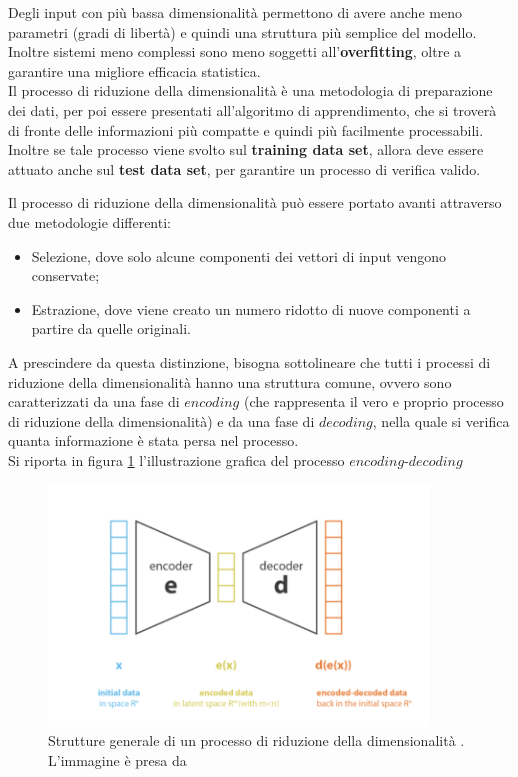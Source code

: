 Degli input con più bassa dimensionalità permettono di avere anche meno parametri (gradi di libertà) e quindi una struttura più semplice del modello. Inoltre sistemi meno complessi sono meno soggetti all'\textbf{overfitting}, oltre a garantire una migliore efficacia statistica. \\
Il processo di riduzione della dimensionalità è una metodologia di preparazione dei dati, per poi essere presentati all'algoritmo di apprendimento, che si troverà di fronte delle informazioni più compatte e quindi più facilmente processabili. Inoltre se tale processo viene svolto sul \textbf{training data set}, allora deve essere attuato anche sul \textbf{test data set}, per garantire un processo di verifica valido.

\newpage

Il processo di riduzione della dimensionalità può essere portato avanti attraverso due metodologie differenti:
\begin{itemize}
	\item Selezione, dove solo alcune componenti dei vettori di input vengono conservate;
	\item Estrazione, dove viene creato un numero ridotto di nuove componenti a partire da quelle originali.
\end{itemize}
A prescindere da questa distinzione, bisogna sottolineare che tutti i processi di riduzione della dimensionalità hanno una struttura comune, ovvero sono caratterizzati da una fase di $\textit{encoding}$ (che rappresenta il vero e proprio processo di riduzione della dimensionalità) e da una fase di $\textit{decoding}$, nella quale si verifica quanta informazione è stata persa nel processo. \\ 
Si riporta in figura \ref{encoder-decoder} l'illustrazione grafica del processo $\textit{encoding-decoding}$
\begin{figure}[h!]
	\centering
	\includegraphics[width=0.90\textwidth]{figs/encoder-decoder.png}
	\caption{Strutture generale di un processo di riduzione della dimensionalità . L'immagine è presa da \cite{Understanding_VAEs}}
	\label{encoder-decoder}
\end{figure}

